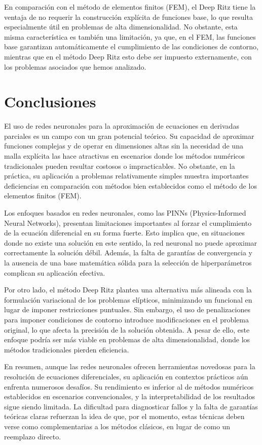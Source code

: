 \documentclass[a4paper,11pt,spanish, twoside, leqno]{tfg-uam}
\theoremstyle{definition}
\begin{document}
En comparación con el método de elementos finitos (FEM), el Deep Ritz tiene la ventaja de no requerir la construcción explícita de funciones base, lo que resulta especialmente útil en problemas de alta dimensionalidad. No obstante, esta misma característica es también una limitación, ya que, en el FEM, las funciones base garantizan automáticamente el cumplimiento de las condiciones de contorno, mientras que en el método Deep Ritz esto debe ser impuesto externamente, con los problemas asociados que hemos analizado.

\chapter{Conclusiones}\label{chap4}

El uso de redes neuronales para la aproximación de ecuaciones en derivadas parciales es un campo con un gran potencial teórico. Su capacidad de aproximar funciones complejas y de operar en dimensiones altas sin la necesidad de una malla explícita las hace atractivas en escenarios donde los métodos numéricos tradicionales pueden resultar costosos o impracticables. No obstante, en la práctica, su aplicación a problemas relativamente simples muestra importantes deficiencias en comparación con métodos bien establecidos como el método de los elementos finitos (FEM).

Los enfoques basados en redes neuronales, como las PINNs (Physics-Informed Neural Networks), presentan limitaciones importantes al forzar el cumplimiento de la ecuación diferencial en su forma fuerte. Esto implica que, en situaciones donde no existe una solución en este sentido, la red neuronal no puede aproximar correctamente la solución débil. Además, la falta de garantías de convergencia y la ausencia de una base matemática sólida para la selección de hiperparámetros complican su aplicación efectiva.

Por otro lado, el método Deep Ritz plantea una alternativa más alineada con la formulación variacional de los problemas elípticos, minimizando un funcional en lugar de imponer restricciones puntuales. Sin embargo, el uso de penalizaciones para imponer condiciones de contorno introduce modificaciones en el problema original, lo que afecta la precisión de la solución obtenida. A pesar de ello, este enfoque podría ser más viable en problemas de alta dimensionalidad, donde los métodos tradicionales pierden eficiencia.

En resumen, aunque las redes neuronales ofrecen herramientas novedosas para la resolución de ecuaciones diferenciales, su aplicación en contextos prácticos aún enfrenta numerosos desafíos. Su rendimiento es inferior al de métodos numéricos establecidos en escenarios convencionales, y la interpretabilidad de los resultados sigue siendo limitada. La dificultad para diagnosticar fallos y la falta de garantías teóricas claras refuerzan la idea de que, por el momento, estas técnicas deben verse como complementarias a los métodos clásicos, en lugar de como un reemplazo directo.
\end{document}
